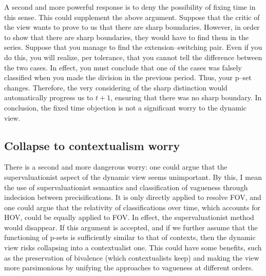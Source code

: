 A second and more powerful response is to deny the possibility of fixing
time in this sense. This could supplement the above argument. Suppose
that the critic of the view wants to prove to us that there are sharp
boundaries. However, in order to show that there are sharp boundaries,
they would have to find them in the series. Suppose that you manage to
find the extension--switching pair. Even if you do this, you will
realize, per tolerance, that you cannot tell the difference between the
two cases. In effect, you must conclude that one of the cases was
falsely classified when you made the division in the previous period.
Thus, your p--set changes. Therefore, the very considering of the sharp
distinction would automatically progress us to $t+1$, ensuring that there
was no sharp boundary. In conclusion, the fixed time objection is not a
significant worry to the dynamic view.

\subsection{Collapse to contextualism worry}

There is a second and more dangerous worry: one could argue that the
supervaluationist aspect of the dynamic view seems unimportant. By this,
I mean the use of supervaluationist semantics and classification of
vagueness through indecision between precisifications. It is only
directly applied to resolve FOV, and one could argue that the relativity
of classifications over time, which accounts for HOV, could be equally
applied to FOV. In effect, the supervaluationist method would disappear.
If this argument is accepted, and if we further assume that the
functioning of p-sets is sufficiently similar to that of contexts, then
the dynamic view risks collapsing into a contextualist one. This could
have some benefits, such as the preservation of bivalence (which
contextualists keep) and making the view more parsimonious by unifying
the approaches to vagueness at different orders.

